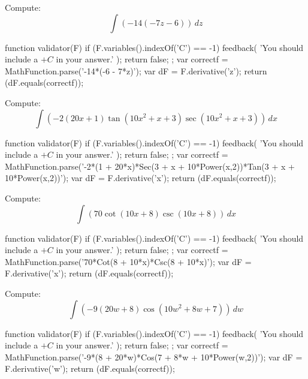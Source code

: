 \documentclass{ximera}
\renewcommand{\d}{\, d}
\begin{document}
\begin{exercise}
Compute: 
\[
\int \left(-14 (-7 z-6)\right)\d z
\]
\begin{expressionAnswer}
     function validator(F) {
      if (F.variables().indexOf('C') == -1) {
        feedback( 'You should include a $+C$ in your answer.' );
        return false;
      };      
      var correctf = MathFunction.parse('-14*(-6 - 7*z)');
      var dF = F.derivative('z');
      return (dF.equals(correctf));
    }
\end{expressionAnswer}
\end{exercise}



\begin{exercise}
Compute: 
\[
\int \left(-2 (20 x+1) \tan \left(10 x^2+x+3\right) \sec \left(10 x^2+x+3\right)\right)\d x
\]
\begin{expressionAnswer}
     function validator(F) {
      if (F.variables().indexOf('C') == -1) {
        feedback( 'You should include a $+C$ in your answer.' );
        return false;
      };      
      var correctf = MathFunction.parse('-2*(1 + 20*x)*Sec(3 + x + 10*Power(x,2))*Tan(3 + x + 10*Power(x,2))');
      var dF = F.derivative('x');
      return (dF.equals(correctf));
    }
\end{expressionAnswer}
\end{exercise}



\begin{exercise}
Compute: 
\[
\int \left(70 \cot (10 x+8) \csc (10 x+8)\right)\d x
\]
\begin{expressionAnswer}
     function validator(F) {
      if (F.variables().indexOf('C') == -1) {
        feedback( 'You should include a $+C$ in your answer.' );
        return false;
      };      
      var correctf = MathFunction.parse('70*Cot(8 + 10*x)*Csc(8 + 10*x)');
      var dF = F.derivative('x');
      return (dF.equals(correctf));
    }
\end{expressionAnswer}
\end{exercise}



\begin{exercise}
Compute: 
\[
\int \left(-9 (20 w+8) \cos \left(10 w^2+8 w+7\right)\right)\d w
\]
\begin{expressionAnswer}
     function validator(F) {
      if (F.variables().indexOf('C') == -1) {
        feedback( 'You should include a $+C$ in your answer.' );
        return false;
      };      
      var correctf = MathFunction.parse('-9*(8 + 20*w)*Cos(7 + 8*w + 10*Power(w,2))');
      var dF = F.derivative('w');
      return (dF.equals(correctf));
    }
\end{expressionAnswer}
\end{exercise}
\end{document}
